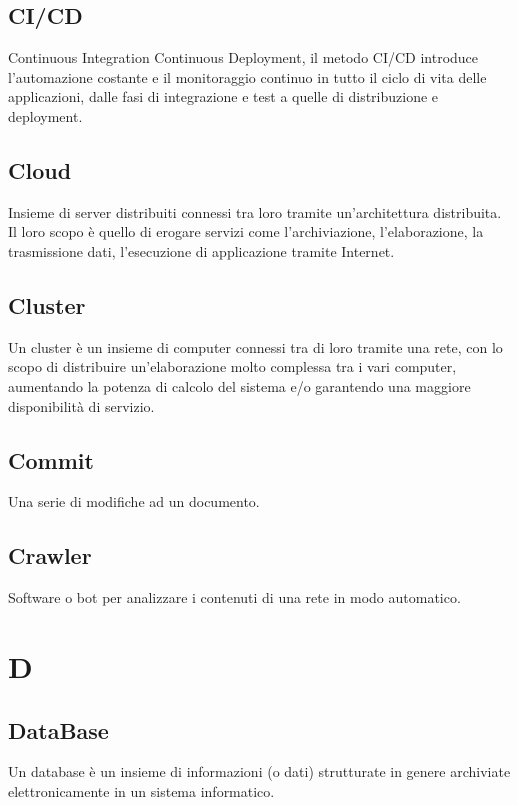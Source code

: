 \documentclass{classes/base}
\begin{document}
        \subsection*{CI/CD}
        Continuous Integration Continuous Deployment, il metodo CI/CD introduce l'automazione costante e il monitoraggio continuo in tutto il ciclo di vita delle applicazioni, dalle fasi di integrazione e test a quelle di distribuzione e deployment.
    
        \subsection*{Cloud}
        Insieme di server distribuiti connessi tra loro tramite un'architettura distribuita. Il loro scopo è quello di erogare servizi come l'archiviazione, l'elaborazione, la trasmissione dati, l'esecuzione di applicazione tramite Internet.
        
        \subsection*{Cluster}
        Un cluster è un insieme di computer connessi tra di loro tramite una rete, con lo scopo di distribuire un'elaborazione molto complessa tra i vari computer, aumentando la potenza di calcolo del sistema e/o garantendo una maggiore disponibilità di servizio.
    
        \subsection*{Commit}
        Una serie di modifiche ad un documento.
        
        \subsection*{Crawler}
        Software o bot per analizzare i contenuti di una rete in modo automatico.
        
        \newpage  
    \section{D}
        \subsection*{DataBase}
        Un database è un insieme di informazioni (o dati) strutturate in genere archiviate elettronicamente in un sistema informatico.
\end{document}
